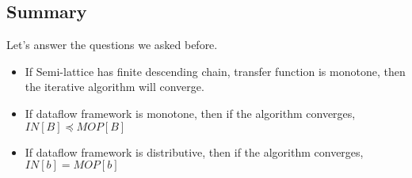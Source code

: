 \subsection{Summary}
Let's answer the questions we asked before.
\begin{itemize}
    \item If Semi-lattice has finite descending chain, transfer function is monotone,
    then the iterative algorithm will converge.
    \item  If dataflow framework is monotone,  then if the algorithm converges,
    $IN[B] \preceq  MOP[B] $
    \item If dataflow framework is distributive, then if the algorithm converges, 
    $IN[b] = MOP[b]$
\end{itemize}  














































